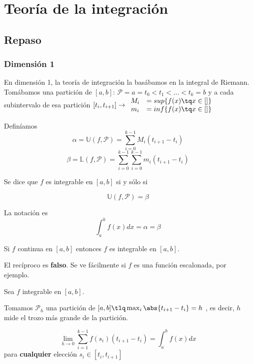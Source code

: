 

\section{Teoría de la integración}

\subsection{Repaso}

\subsubsection{Dimensión 1}

En dimensión 1, la teoría de integración la basábamos en la integral de Riemann. Tomábamos una partición de $[a,b]$: $\mathcal{P} = a = t_0 < t_1<...<t_k = b$ y a cada subintervalo de esa partición $[t_i,t_{i+1}] \rightarrow \begin{array}{cc} 
M_i &= sup\{f(x)\tq x\in []\}\\
m_i &= inf \{f(x)\tq x\in []\}\end{array}$ 

Definíamos \[ \alpha = \mathbb{U}(f,\mathcal{P}) = \sum_{i=0}^{k-1} M_i(t_{i+1}-t_i)\]
\[ \beta = \mathbb{L}(f,\mathcal{P}) = \sum_{i=0}^{k-1} \sum_{i=0}^{k-1} m_i(t_{i+1}-t_i)\]

\begin{defn} Se dice que $f$ es integrable en $[a,b]$ si y sólo si 

\[ \mathbb{U}(f,\mathcal{P}) = \beta \] 

La notación es \[ \int_a^b f(x)dx = \alpha = \beta \]
\end{defn}

\begin{theorem}
Si $f$ continua en $[a,b]$ entonces  $f$ es integrable en $[a,b]$.
\end{theorem}

El recíproco es \textbf{falso}. Se ve fácilmente si $f$ es una función escalonada, por ejemplo.

\begin{theorem} Sea $f$ integrable en $[a,b]$.

Tomamos $\mathcal{P}_h$ una partición de $[a,b] \tlq \max_{i} \abs{t_{i+1}-t_i} = h$ , es decir, $h$ mide el trozo más grande de la partición.

\[ \lim_{h\rightarrow 0} \sum_{i=1}^{k-1} f(s_i)(t_{i+1}-t_i) = \int_a^bf(x)dx \] para \textbf{cualquier} elección $s_i\in[t_i,t_{i+1}]$	

\end{theorem} 


